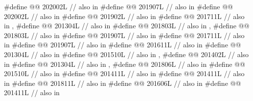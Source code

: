 \begin{codeblock}
#define @@           202002L // also in 
#define @@                   201907L // also in 
#define @@                              202002L // also in 
#define @@                             201902L // also in 
#define @@                  201711L // also in , 
#define @@                       201304L // also in 
#define @@                       201803L // also in , 
#define @@                           201803L // also in 
#define @@              201907L // also in 
#define @@                        201711L // also in 
#define @@                          201907L // also in 
#define @@                          201611L // also in 
#define @@      201304L // also in 
#define @@             201510L // also in , 
#define @@                   201402L // also in 
#define @@                    201304L // also in , 
#define @@                     201806L // also in 
#define @@     201510L // also in 
#define @@               201411L // also in 
#define @@         201411L // also in 
#define @@                        201811L // also in 
#define @@                           201606L // also in 
#define @@                            201411L // also in 
\end{codeblock}

